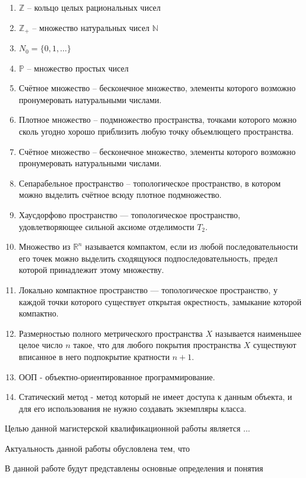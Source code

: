 \documentclass[master, och, diploma, times]{sty/SCWorks}
\theoremstyle{plain}
\theoremstyle{definition}
\begin{document}
\begin{enumerate}
	\item $\mathbb {Z}$ -- кольцо целых рациональных чисел
	\item $\mathbb {Z}_{+}$ -- множество натуральных чисел $\mathbb {N}$
	\item ${N}_0=\{0,1,\dots\}$
	\item $\mathbb {P}$ -- множество простых чисел
	\item Счётное множество -- бесконечное множество, элементы которого возможно пронумеровать натуральными числами.
	\item Плотное множество -- подмножество пространства, точками которого можно сколь угодно хорошо приблизить любую точку объемлющего пространства.
	\item Счётное множество -- бесконечное множество, элементы которого возможно пронумеровать натуральными числами.
	\item Сепарабельное пространство -- топологическое пространство, в котором можно выделить счётное всюду плотное подмножество.
	\item Хаусдорфово пространство — топологическое пространство, удовлетворяющее сильной аксиоме отделимости $T_2$.
	\item Множество из $\mathbb {R}^n$ называется компактом, если из любой последовательности его точек можно выделить сходящуюся подпоследовательность, предел которой принадлежит этому множеству.
	\item Локально компактное пространство — топологическое пространство, у каждой точки которого существует открытая окрестность, замыкание которой компактно.
	\item Размерностью полного метрического пространства $X$ называется наименьшее целое число $n$ такое, что для любого покрытия пространства $X$ существуют вписанное в него подпокрытие кратности $n+1$.
	\item ООП - объектно-ориентированное программирование.
	\item Статический метод - метод который не имеет доступа к данным объекта, и для его использования не нужно создавать экземпляры класса.
\end{enumerate}

\intro
Целью данной магистерской квалификационной работы является ...

Актуальность данной работы обусловлена тем, что

В данной работе будут представлены основные определения и понятия
\end{document}

